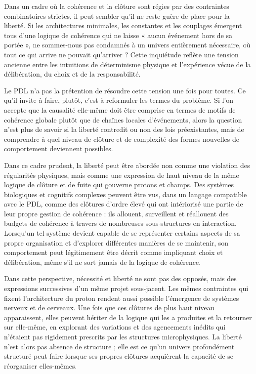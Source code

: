 \documentclass[11pt,a4paper]{article}
\theoremstyle{definition}
\begin{document}
Dans un cadre où la cohérence et la clôture sont régies par des contraintes combinatoires strictes, il peut sembler qu’il ne reste guère de place pour la liberté. Si les architectures minimales, les constantes et les couplages émergent tous d’une logique de cohérence qui ne laisse « aucun événement hors de sa portée », ne sommes-nous pas condamnés à un univers entièrement nécessaire, où tout ce qui arrive ne pouvait qu’arriver ?\cite{Laubscher_Existence_PulsatingClosure_2026,Laubscher_PDL_Position_2024} Cette inquiétude reflète une tension ancienne entre les intuitions de déterminisme physique et l’expérience vécue de la délibération, du choix et de la responsabilité.

Le PDL n’a pas la prétention de résoudre cette tension une fois pour toutes. Ce qu’il invite à faire, plutôt, c’est à reformuler les termes du problème. Si l’on accepte que la causalité elle-même doit être comprise en termes de motifs de cohérence globale plutôt que de chaînes locales d’événements, alors la question n’est plus de savoir si la liberté contredit ou non des lois préexistantes, mais de comprendre à quel niveau de clôture et de complexité des formes nouvelles de comportement deviennent possibles.\cite{Laubscher_Existence_PulsatingClosure_2026,Laubscher_PDL_TO_Dialogue_2024}

Dans ce cadre prudent, la liberté peut être abordée non comme une violation des régularités physiques, mais comme une expression de haut niveau de la même logique de clôture et de fuite qui gouverne protons et champs. Des systèmes biologiques et cognitifs complexes peuvent être vus, dans un langage compatible avec le PDL, comme des clôtures d’ordre élevé qui ont intériorisé une partie de leur propre gestion de cohérence : ils allouent, surveillent et réallouent des budgets de cohérence à travers de nombreuses sous-structures en interaction.\cite{Laubscher_Existence_PulsatingClosure_2026} Lorsqu’un tel système devient capable de se représenter certains aspects de sa propre organisation et d’explorer différentes manières de se maintenir, son comportement peut légitimement être décrit comme impliquant choix et délibération, même s’il ne sort jamais de la logique de cohérence.

Dans cette perspective, nécessité et liberté ne sont pas des opposés, mais des expressions successives d’un même projet sous-jacent. Les mêmes contraintes qui fixent l’architecture du proton rendent aussi possible l’émergence de systèmes nerveux et de cerveaux. Une fois que ces clôtures de plus haut niveau apparaissent, elles peuvent hériter de la logique qui les a produites et la retourner sur elle-même, en explorant des variations et des agencements inédits qui n’étaient pas rigidement prescrits par les structures microphysiques.\cite{Laubscher_PDL_TO_Dialogue_2024} La liberté n’est alors pas absence de structure ; elle est ce qu’un univers profondément structuré peut faire lorsque ses propres clôtures acquièrent la capacité de se réorganiser elles-mêmes.
\end{document}
